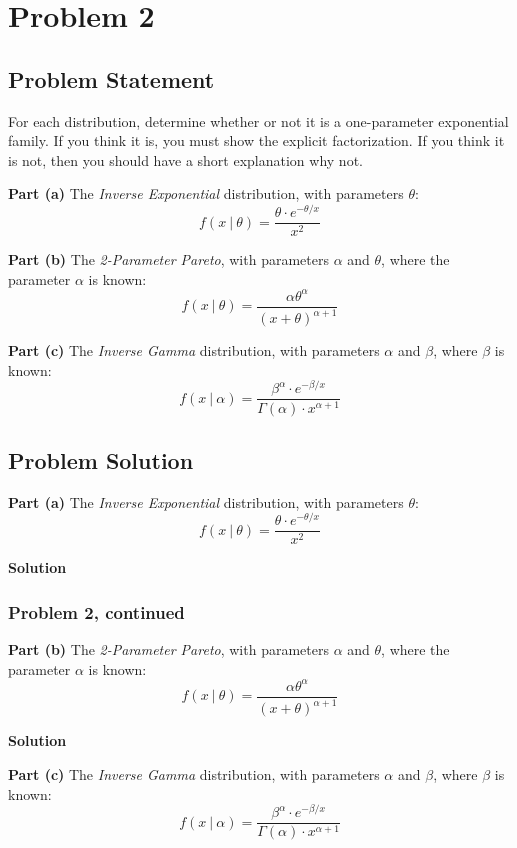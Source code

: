 \documentclass[12pt]{article}
\theoremstyle{definition}
\begin{document}
\newpage
\section*{Problem 2}

\subsection*{Problem Statement}

For each distribution, determine whether or not it is a one-parameter exponential family. If you think it is, you must show the explicit factorization. If you think it is not, then you should have a short explanation why not. 

\bigskip
\noindent
{\bf Part (a)} The {\em Inverse Exponential} distribution, with parameters $\theta$:
$$
f(x\ |\ \theta) = \frac{ \theta \cdot e^{-\theta/x} }{x^2 }
$$

\bigskip
\noindent
{\bf Part (b)} The {\em 2-Parameter Pareto}, with parameters $\alpha$ and $\theta$, where the parameter $\alpha$ is known:
$$
f(x\ |\ \theta) = \frac{ \alpha \theta^\alpha }{ (x + \theta)^{\alpha + 1}}
$$

\bigskip
\noindent
{\bf Part (c)} The {\em Inverse Gamma} distribution, with parameters $\alpha$ and $\beta$, where $\beta$ is known:
$$
f(x\ |\ \alpha) = \frac{ \beta^\alpha \cdot e^{-\beta/x} }{\Gamma(\alpha) \cdot x^{\alpha + 1} }
$$


\subsection*{Problem Solution}
\noindent
{\bf Part (a)} The {\em Inverse Exponential} distribution, with parameters $\theta$:
$$
f(x\ |\ \theta) = \frac{ \theta \cdot e^{-\theta/x} }{x^2 }
$$

\bigskip
\noindent
{\bf Solution}

\newpage
\subsubsection*{Problem 2, continued}

\noindent
{\bf Part (b)} The {\em 2-Parameter Pareto}, with parameters $\alpha$ and $\theta$, where the parameter $\alpha$ is known:
$$
f(x\ |\ \theta) = \frac{ \alpha \theta^\alpha }{ (x + \theta)^{\alpha + 1}}
$$

\bigskip
\noindent
{\bf Solution}


\vspace{3in}
\noindent
{\bf Part (c)} The {\em Inverse Gamma} distribution, with parameters $\alpha$ and $\beta$, where $\beta$ is known:
$$
f(x\ |\ \alpha) = \frac{ \beta^\alpha \cdot e^{-\beta/x} }{\Gamma(\alpha) \cdot x^{\alpha + 1} }
$$
\end{document}
